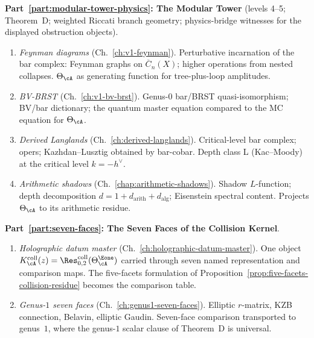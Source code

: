 \textbf{Part~\ref{part:modular-tower-physics}: The Modular Tower} (levels 4--5; Theorem~D; weighted Riccati branch geometry; physics-bridge witnesses for the displayed obstruction objects).
\begin{enumerate}[label=\textup{\arabic*.}, start=25]
\item \emph{Feynman diagrams} (Ch.~\ref{ch:v1-feynman}).
 Perturbative incarnation of the bar complex: Feynman graphs on
 $\overline{C}_n(X)$; higher operations from nested collapses.
 $\Theta_\cA$ as generating function for tree-plus-loop amplitudes.

\item \emph{BV-BRST} (Ch.~\ref{ch:v1-bv-brst}).
 Genus-$0$ bar/BRST quasi-isomorphism; BV/bar dictionary; the
 quantum master equation compared to the MC equation for
 $\Theta_\cA$.

\item \emph{Derived Langlands} (Ch.~\ref{ch:derived-langlands}).
 Critical-level bar complex; opers; Kazhdan--Lusztig obtained by
 bar-cobar. Depth class L (Kac--Moody) at the critical
 level $k = -h^\vee$.

\item \emph{Arithmetic shadows} (Ch.~\ref{chap:arithmetic-shadows}).
 Shadow $L$-function; depth decomposition
 $d = 1 + d_{\mathrm{arith}} + d_{\mathrm{alg}}$; Eisenstein
 spectral content. Projects $\Theta_\cA$ to its arithmetic residue.
\end{enumerate}

\textbf{Part~\ref{part:seven-faces}: The Seven Faces of the Collision Kernel}.
\begin{enumerate}[label=\textup{\arabic*.}, start=29]
\item \emph{Holographic datum master}
 (Ch.~\ref{ch:holographic-datum-master}).
 One object
 $K_\cA^{\mathrm{coll}}(z)
 =\Res^{\mathrm{coll}}_{0,2}(\Theta_\cA^{\Eone})$
 carried through seven named representation and comparison maps. The
 five-facets formulation of
 Proposition~\ref{prop:five-facets-collision-residue} becomes the
 comparison table.

\item \emph{Genus-$1$ seven faces}
 (Ch.~\ref{ch:genus1-seven-faces}).
 Elliptic $r$-matrix, KZB connection, Belavin, elliptic Gaudin.
 Seven-face comparison transported to genus~$1$, where
 the genus-$1$ scalar clause of Theorem~D is universal.
\end{enumerate}

